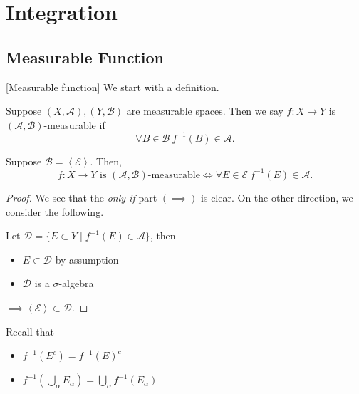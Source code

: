 \section{Integration}
\subsection{Measurable Function}[Measurable function]\label{def:measurable-function}
We start with a definition.
\begin{definition}
	Suppose \((X, \mathcal{A} ), (Y, \mathcal{B} )\) are measurable spaces. Then we say \(f\colon X\to Y\) is
	\((\mathcal{A} , \mathcal{B} )\)-measurable if
	\[
		\forall B\in \mathcal{B}\ f^{-1} (B)\in \mathcal{A}.
	\]
\end{definition}

\begin{lemma}\label{lma:lec10-1}
	Suppose \(\mathcal{B} = \left< \mathcal{E}  \right> \). Then,
	\[
		f\colon X\to Y \text{ is \((\mathcal{A} , \mathcal{B})\)-measurable}\iff \forall E\in\mathcal{E} \ f^{-1} (E)\in \mathcal{A}.
	\]
\end{lemma}
\begin{proof}
	We see that the \emph{only if} part \((\implies )\) is clear. On the other direction, we consider the following.

	\par Let \(\mathcal{D} = \{E\subset Y \mid f^{-1} (E)\in \mathcal{A} \}\), then
	\begin{itemize}
		\item \(E\subset \mathcal{D} \) by assumption
		\item \(\mathcal{D} \) is a \(\sigma\)-algebra 
	\end{itemize}
	\(\implies \left< \mathcal{E} \right> \subset \mathcal{D} \).
\end{proof}
\begin{note}
	Recall that
	\begin{itemize}
		\item \(f^{-1} (E^{c} ) = f^{-1} (E)^{c} \)
		\item \(f^{-1} (\bigcup\limits_{\alpha} E_{\alpha }) = \bigcup\limits_{\alpha} f^{-1} (E_{\alpha })\)
	\end{itemize}
\end{note}

